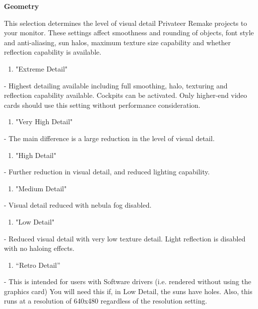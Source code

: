\documentclass{article}
\begin{document}
\textbf{Geometry}

This selection determines the level of visual detail Privateer Remake projects to your monitor. These settings affect smoothness and rounding of objects, font style and anti-aliasing, sun halos, maximum texture size capability and whether reflection capability is available. 



\begin{enumerate}
\item  "Extreme Detail"
\end{enumerate}

- Highest detailing available including full smoothing, halo, texturing and reflection capability available. Cockpits can be activated. Only higher-end video cards should use this setting without performance consideration. 

\begin{enumerate}
\item  "Very High Detail"
\end{enumerate}

 - The main difference is a large reduction in the level of visual detail. 

\begin{enumerate}
\item  "High Detail" 
\end{enumerate}

 - Further reduction in visual detail, and reduced lighting capability. 

\begin{enumerate}
\item  "Medium Detail"
\end{enumerate}

 - Visual detail reduced with nebula fog disabled. 

\begin{enumerate}
\item  "Low Detail"
\end{enumerate}

 - Reduced visual detail with very low texture detail. Light reflection is disabled with no haloing  effects. 

\begin{enumerate}
\item  ``Retro Detail'' 
\end{enumerate}

 - This is intended for users with Software drivers (i.e. rendered without using the graphics card)   You will need this if, in Low Detail, the suns have holes.  Also, this runs at a resolution of 640x480  regardless of the resolution setting.
 
\end{document}
